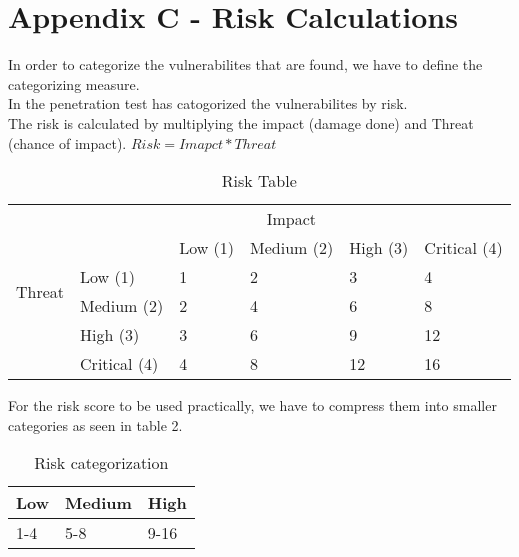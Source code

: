 \section{Appendix C - Risk Calculations}

In order to categorize the vulnerabilites that are found, we have to define the categorizing measure. \\
In the penetration test has catogorized the vulnerabilites by risk. \\
The risk is calculated by multiplying the impact (damage done) and Threat (chance of impact). \(Risk = Imapct * Threat\) \\
\begin{table}[h]
\centering
\begin{tabular}{llllll}
\multirow{6}{*}{Threat} & \multicolumn{5}{c}{Impact}                                                                                                                                             \\ \cline{3-6} 
                        & \multicolumn{1}{l|}{}             & \multicolumn{1}{l|}{Low (1)} & \multicolumn{1}{l|}{Medium (2)} & \multicolumn{1}{l|}{High (3)} & \multicolumn{1}{l|}{Critical (4)} \\ \cline{2-6} 
                        & \multicolumn{1}{l|}{Low (1)}      & \multicolumn{1}{l|}{1}       & \multicolumn{1}{l|}{2}          & \multicolumn{1}{l|}{3}        & \multicolumn{1}{l|}{4}            \\ \cline{2-6} 
                        & \multicolumn{1}{l|}{Medium (2)}   & \multicolumn{1}{l|}{2}       & \multicolumn{1}{l|}{4}          & \multicolumn{1}{l|}{6}        & \multicolumn{1}{l|}{8}            \\ \cline{2-6} 
                        & \multicolumn{1}{l|}{High (3)}     & \multicolumn{1}{l|}{3}       & \multicolumn{1}{l|}{6}          & \multicolumn{1}{l|}{9}        & \multicolumn{1}{l|}{12}           \\ \cline{2-6} 
                        & \multicolumn{1}{l|}{Critical (4)} & \multicolumn{1}{l|}{4}       & \multicolumn{1}{l|}{8}          & \multicolumn{1}{l|}{12}       & \multicolumn{1}{l|}{16}           \\ \cline{2-6} 
\end{tabular}
\caption{Risk Table}
\label{my-label}
\end{table}

For the risk score to be used practically, we have to compress them into smaller categories as seen in table 2.

\begin{table}[h]
\centering
\begin{tabular}{|l|l|l|}
\hline
Low & Medium & High \\ \hline
1-4 & 5-8    & 9-16 \\ \hline
\end{tabular}
\caption{Risk categorization}
\label{my-label}
\end{table}
